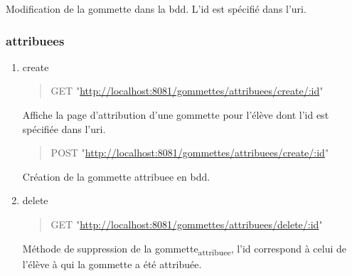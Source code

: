 \documentclass[11pt]{article}
\begin{document}
Modification de la gommette dans la bdd. L'id est spécifié dans l'uri.

\subsubsection{attribuees}
\label{sec:orgc12268c}
\begin{enumerate}
\item create
\label{sec:org09997f7}

\begin{quote}
GET "\url{http://localhost:8081/gommettes/attribuees/create/:id}"
\end{quote}

Affiche la page d'attribution d'une gommette pour l'élève dont l'id est spécifiée dans l'uri.

\begin{quote}
POST "\url{http://localhost:8081/gommettes/attribuees/create/:id}"
\end{quote}

Création de la gommette attribuee en bdd.

\item delete
\label{sec:org59dafab}

\begin{quote}
GET "\url{http://localhost:8081/gommettes/attribuees/delete/:id}"
\end{quote}

Méthode de suppression de la gommette\textsubscript{attribuee}, l'id correspond à celui de l'élève à qui 
la gommette a été attribuée.

\newpage
\listoffigures
\end{enumerate}
\end{document}
